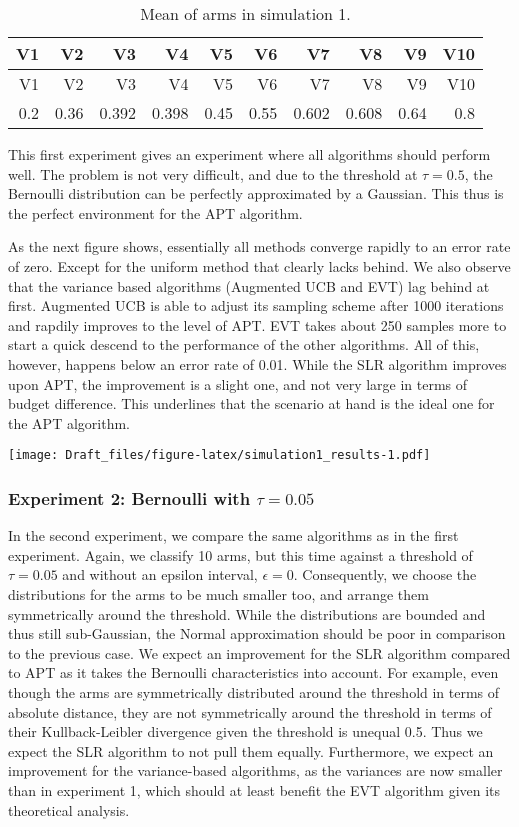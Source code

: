 \documentclass[12pt,]{article}
\begin{document}
\begin{longtable}[]{@{}rrrrrrrrrr@{}}
\caption{Mean of arms in simulation 1.}\tabularnewline
\toprule
V1 & V2 & V3 & V4 & V5 & V6 & V7 & V8 & V9 & V10\tabularnewline
\midrule
\endfirsthead
\toprule
V1 & V2 & V3 & V4 & V5 & V6 & V7 & V8 & V9 & V10\tabularnewline
\midrule
\endhead
0.2 & 0.36 & 0.392 & 0.398 & 0.45 & 0.55 & 0.602 & 0.608 & 0.64 &
0.8\tabularnewline
\bottomrule
\end{longtable}

This first experiment gives an experiment where all algorithms should
perform well. The problem is not very difficult, and due to the
threshold at \(\tau = 0.5\), the Bernoulli distribution can be perfectly
approximated by a Gaussian. This thus is the perfect environment for the
APT algorithm.

As the next figure shows, essentially all methods converge rapidly to an
error rate of zero. Except for the uniform method that clearly lacks
behind. We also observe that the variance based algorithms (Augmented
UCB and EVT) lag behind at first. Augmented UCB is able to adjust its
sampling scheme after 1000 iterations and rapdily improves to the level
of APT. EVT takes about 250 samples more to start a quick descend to the
performance of the other algorithms. All of this, however, happens below
an error rate of 0.01. While the SLR algorithm improves upon APT, the
improvement is a slight one, and not very large in terms of budget
difference. This underlines that the scenario at hand is the ideal one
for the APT algorithm.

\texttt{[image: Draft\_files/figure-latex/simulation1\_results-1.pdf]}

\subsubsection{\texorpdfstring{Experiment 2: Bernoulli with
\(\tau = 0.05\)}{Experiment 2: Bernoulli with \textbackslash{}tau = 0.05}}\label{experiment-2-bernoulli-with-tau-0.05}

In the second experiment, we compare the same algorithms as in the first
experiment. Again, we classify 10 arms, but this time against a
threshold of \(\tau = 0.05\) and without an epsilon interval,
\(\epsilon = 0\). Consequently, we choose the distributions for the arms
to be much smaller too, and arrange them symmetrically around the
threshold. While the distributions are bounded and thus still
sub-Gaussian, the Normal approximation should be poor in comparison to
the previous case. We expect an improvement for the SLR algorithm
compared to APT as it takes the Bernoulli characteristics into account.
For example, even though the arms are symmetrically distributed around
the threshold in terms of absolute distance, they are not symmetrically
around the threshold in terms of their Kullback-Leibler divergence given
the threshold is unequal 0.5. Thus we expect the SLR algorithm to not
pull them equally. Furthermore, we expect an improvement for the
variance-based algorithms, as the variances are now smaller than in
experiment 1, which should at least benefit the EVT algorithm given its
theoretical analysis.
\end{document}
